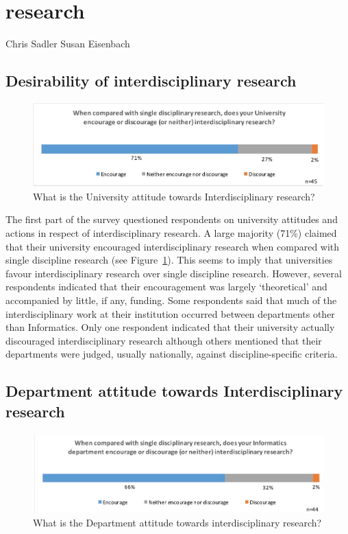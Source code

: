 \section{research}

Chris Sadler 
Susan Eisenbach

\subsection{Desirability of interdisciplinary research}

\begin{figure}[h]
\centering
\includegraphics[width = \linewidth]{charts/1a.jpg}
\caption{What is the University attitude towards Interdisciplinary research?}
\label{sect1:Uattitude}
\end{figure}

The first part of the survey questioned respondents on university attitudes and actions in respect of interdisciplinary research. A large majority (71\%) claimed that their university encouraged interdisciplinary research when compared with single discipline research (see Figure~\ref{sect1:Uattitude}). This seems to imply that universities favour interdisciplinary research over single discipline research.  However, several respondents indicated that their encouragement was largely `theoretical' and accompanied by little, if any, funding. Some respondents said that much of the interdisciplinary work at their institution occurred between departments other than Informatics. Only one respondent indicated that their university actually discouraged interdisciplinary research although others mentioned that their departments were judged, usually nationally, against discipline-specific criteria.

\subsection{Department attitude towards Interdisciplinary research}


\begin{figure}[h]
\centering
\includegraphics[width = \linewidth]{charts/1b.jpg}
\caption{What is the Department attitude towards interdisciplinary research?}
\label{sect1:Dattitude}
\end{figure}

